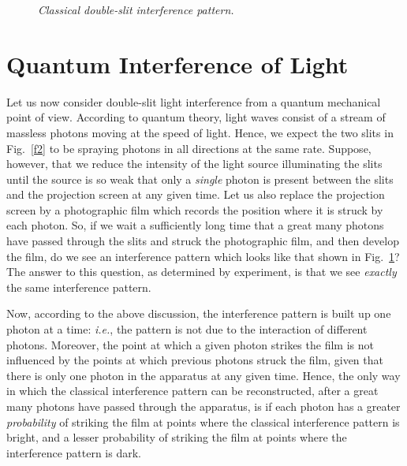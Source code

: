 \begin{figure}
\epsfysize=2in
\centerline{}
\caption{\em Classical double-slit interference pattern.}\label{f3}   
\end{figure}

\section{Quantum Interference of Light}
Let us now consider double-slit light interference from a quantum mechanical point of view.
According to quantum theory, light waves consist of a stream of massless photons moving at the speed of light. Hence, we expect the two slits in Fig.~\ref{f2} to be spraying
photons in all directions at the same rate. Suppose, however, that we reduce the intensity
of the light source illuminating the slits until the source is so weak that only a {\em single}\/ photon 
is present between the slits and the projection screen at any given time. Let us
also replace the projection screen by a photographic film which records  the
position
where it is struck by each photon. So, if we wait a sufficiently long time that
a great many photons  have passed through the slits and struck the photographic film, and then develop the film, do we see an interference pattern which looks like that shown in Fig.~\ref{f3}? The answer to this question, as determined by experiment, is 
that we see {\em exactly}\/ the same interference pattern.

Now, according to the above discussion,  the interference pattern is built
up one photon at a time: {\em i.e.}, the pattern is not due to the interaction
of different photons. Moreover, the point at which a given photon
strikes the film is  not influenced by the points at which  previous photons
struck the film, given that there is only one photon in the
apparatus at any given time. Hence, the only way in which the
classical interference pattern can be reconstructed, after a great many photons have passed through the apparatus, is if each photon has a
greater {\em probability}\/ of striking the film at points where the classical
interference pattern is bright, and a lesser probability of striking the film at points where the
interference pattern is dark.

